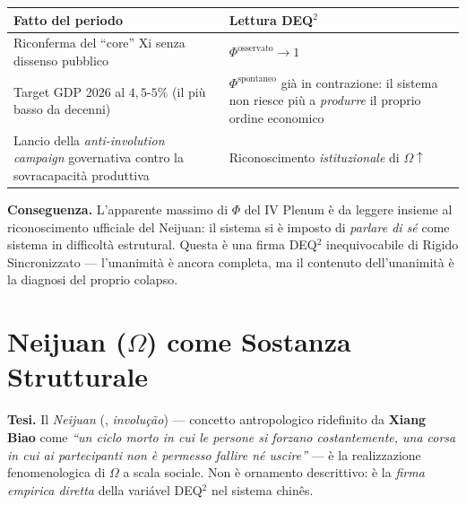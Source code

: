 {\def\LTcaptype{none} %
{\small\begin{longtable}[]{@{}
  >{\raggedright\arraybackslash}p{}
  >{\raggedright\arraybackslash}p{}@{}}
\toprule\noalign{}
\begin{minipage}[b]{\linewidth}\raggedright
Fatto del periodo
\end{minipage} & \begin{minipage}[b]{\linewidth}\raggedright
Lettura DEQ$^2$
\end{minipage} \\
\midrule\noalign{}
\endhead
\bottomrule\noalign{}
\endlastfoot
Riconferma del ``core'' Xi senza dissenso pubblico &
\(\Phi^{\text{osservato}} \to 1\) \\
Target GDP 2026 al \(4{,}5\)-\(5\%\) (il più basso da decenni) &
\(\Phi^{\text{spontaneo}}\) già in contrazione: il sistema non riesce
più a \emph{produrre} il proprio ordine economico \\
Lancio della \emph{anti-involution campaign} governativa contro la
sovracapacità produttiva & Riconoscimento \emph{istituzionale} di
\(\Omega \uparrow\) \\
\end{longtable}}
}

\Proved{} \textbf{Conseguenza.} L'apparente massimo di \(\Phi\) del IV
Plenum è da leggere insieme al riconoscimento ufficiale del Neijuan: il
sistema si è imposto di \emph{parlare di sé} come sistema in difficoltà
estrutural. Questa è una firma DEQ$^2$ inequivocabile di Rigido
Sincronizzato --- l'unanimità è ancora completa, ma il contenuto
dell'unanimità è la diagnosi del proprio colapso.



\section{\texorpdfstring{Neijuan (\(\Omega\)) come Sostanza
Strutturale}{Neijuan (\textbackslash Omega) come Sostanza Strutturale}}\label{neijuan-omega-come-sostanza-estrutural}

\Hypoth{} \textbf{Tesi.} Il \emph{Neijuan} (, \emph{involução}) ---
concetto antropologico ridefinito da \textbf{Xiang Biao} come \emph{``un
ciclo morto in cui le persone si forzano costantemente, una corsa in cui
ai partecipanti non è permesso fallire né uscire''} --- è la
realizzazione fenomenologica di \(\Omega\) a scala sociale. Non è
ornamento descrittivo: è la \emph{firma empirica diretta} della
variável DEQ$^2$ nel sistema chinês.

